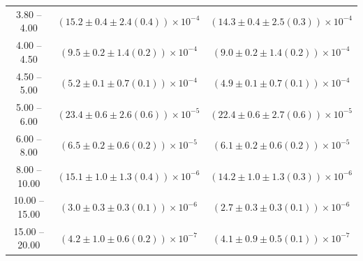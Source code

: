 \begin{table}
\begin{center}
\begin{tabular}{ c | c c }
3.80 -- 4.00 & $(15.2\pm0.4\pm2.4(0.4))\times10^{-4}$ & $(14.3\pm0.4\pm2.5(0.3))\times10^{-4}$ \\ 
4.00 -- 4.50 & $(9.5\pm0.2\pm1.4(0.2))\times10^{-4}$ & $(9.0\pm0.2\pm1.4(0.2))\times10^{-4}$ \\ 
4.50 -- 5.00 & $(5.2\pm0.1\pm0.7(0.1))\times10^{-4}$ & $(4.9\pm0.1\pm0.7(0.1))\times10^{-4}$ \\ 
5.00 -- 6.00 & $(23.4\pm0.6\pm2.6(0.6))\times10^{-5}$ & $(22.4\pm0.6\pm2.7(0.6))\times10^{-5}$ \\ 
6.00 -- 8.00 & $(6.5\pm0.2\pm0.6(0.2))\times10^{-5}$ & $(6.1\pm0.2\pm0.6(0.2))\times10^{-5}$ \\ 
8.00 -- 10.00 & $(15.1\pm1.0\pm1.3(0.4))\times10^{-6}$ & $(14.2\pm1.0\pm1.3(0.3))\times10^{-6}$ \\ 
10.00 -- 15.00 & $(3.0\pm0.3\pm0.3(0.1))\times10^{-6}$ & $(2.7\pm0.3\pm0.3(0.1))\times10^{-6}$ \\ 
15.00 -- 20.00 & $(4.2\pm1.0\pm0.6(0.2))\times10^{-7}$ & $(4.1\pm0.9\pm0.5(0.1))\times10^{-7}$ \\ 
\hline
\end{tabular}
\end{center}
\end{table}
 

